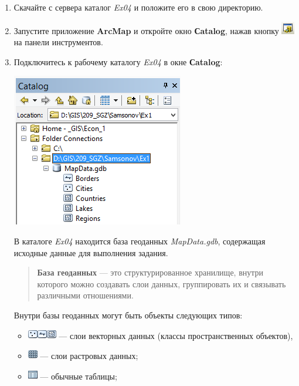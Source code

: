 \documentclass[]{book}
\providecommand{\tightlist}{%
  \setlength{\itemsep}{0pt}\setlength{\parskip}{0pt}}
\theoremstyle{definition}
\theoremstyle{definition}
\theoremstyle{definition}
\theoremstyle{remark}
\begin{document}
\begin{enumerate}
\def\labelenumi{\arabic{enumi}.}
\item
  Скачайте с сервера каталог \emph{Ex04} и положите его в свою
  директорию.
\item
  Запустите приложение \textbf{ArcMap} и откройте окно \textbf{Сatalog},
  нажав кнопку \includegraphics{images/Ex01/image2.png} на панели
  инструментов.
\item
  Подключитесь к рабочему каталогу \emph{Ex04} в окне \textbf{Сatalog}:

  \includegraphics{images/Ex04/image2.png}

  В каталоге \emph{Ex04} находится база геоданных \emph{MapData.gdb},
  содержащая исходные данные для выполнения задания.

  \begin{quote}
  \textbf{База геоданных} --- это структурированное хранилище, внутри
  которого можно создавать слои данных, группировать их и связывать
  различными отношениями.
  \end{quote}

  Внутри базы геоданных могут быть объекты следующих типов:

  \begin{itemize}
  \tightlist
  \item
    \includegraphics{images/Ex04/image3.png}\includegraphics{images/Ex04/image4.png}\includegraphics{images/Ex04/image5.png}
    --- слои векторных данных (классы пространственных объектов),
  \item
    \includegraphics{images/Ex04/image6.png} --- слои растровых данных;
  \item
    \includegraphics{images/Ex04/image7.png} --- обычные таблицы;
  \end{itemize}


\end{enumerate}
\end{document}
